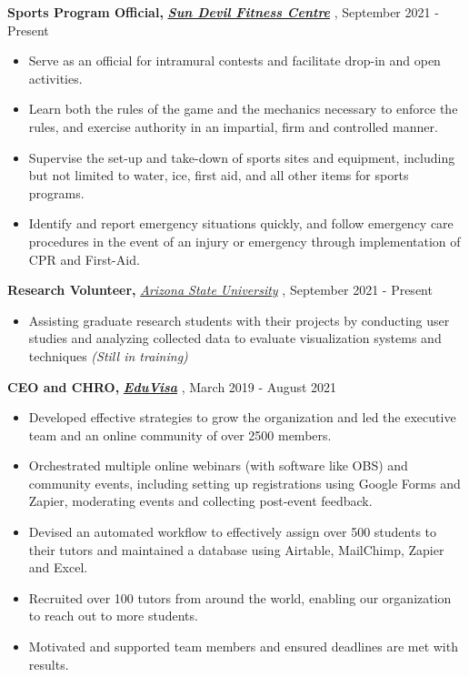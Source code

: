 \documentclass[a4paper]{article}
\begin{document}
\textbf{Sports Program Official, } \textbf\textit{{\href{https://fitness.asu.edu/programs/intramurals}{Sun Devil Fitness Centre}} \faExternalLink},   \hfill September 2021 - Present\\
\vspace{0mm}
\vspace{-1mm}
\begin{itemize}
    \item Serve as an official for intramural contests and facilitate drop-in and open activities.
    \item Learn both the rules of the game and the mechanics necessary to enforce the rules, and exercise authority in an impartial, firm and controlled manner. 
    \item Supervise the set-up and take-down of sports sites and equipment, including but not limited to water, ice, first aid, and all other items for sports programs. 
    \item Identify and report emergency situations quickly, and follow emergency care procedures in the event of an injury or emergency through implementation of CPR and First-Aid. 
\end{itemize}

\textbf{Research Volunteer, } \textit{\href{https://news.asu.edu/20200225-solutions-data-driven-quest-resilient-power-systems}{Arizona State University} \faExternalLink}, \hfill September 2021 - Present\\
\vspace{0mm}
\vspace{-1mm}
\begin{itemize}
    \item Assisting graduate research students with their projects by conducting user studies and analyzing collected data to evaluate visualization systems and techniques \textit{(Still in training)}
\end{itemize}

\textbf{CEO and CHRO, }\textbf\textit{{\href{https://myeduvisa.org/}{EduVisa}} \faExternalLink},   \hfill March 2019 - August 2021\\
\vspace{0mm}
\vspace{-1mm}
\begin{itemize} \itemsep 1pt
	\item Developed effective strategies to grow the organization and led the executive team and an online community of over 2500 members.
	\item Orchestrated multiple online webinars (with software like OBS) and community events, including setting up registrations using Google Forms and Zapier, moderating events and collecting post-event feedback.
	\item Devised an automated workflow to effectively assign over 500 students to their tutors and maintained a database using Airtable, MailChimp, Zapier and Excel.
	\item Recruited over 100 tutors from around the world, enabling our organization to reach out to more students.
	\item Motivated and supported team members and ensured deadlines are met with results.
\end{itemize}
\end{document}
